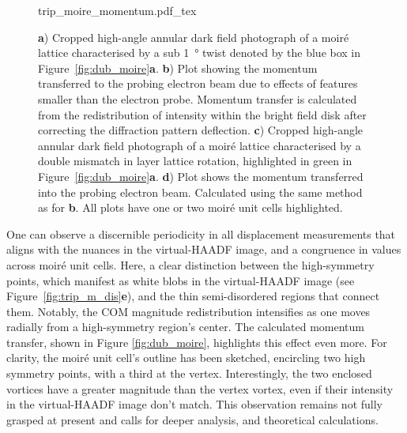 \begin{figure}[h]
    \centering
    \def\svgwidth{.9\linewidth}
    {trip_moire_momentum.pdf_tex}
    \caption{\textbf{a}) Cropped high-angle annular dark field photograph of a moiré lattice characterised by a sub \SI{1}{\degree} twist denoted by the blue box in Figure~\ref{fig:dub_moire}\textbf{a}. \textbf{b}) Plot showing the momentum transferred to the probing electron beam due to effects of features smaller than the electron probe. Momentum transfer is calculated from the redistribution of intensity within the bright field disk after correcting the diffraction pattern deflection. \textbf{c}) Cropped high-angle annular dark field photograph of a moiré lattice characterised by a double mismatch in layer lattice rotation, highlighted in green in Figure~\ref{fig:dub_moire}\textbf{a}. \textbf{d}) Plot shows the momentum transferred into the probing electron beam. Calculated using the same method as for \textbf{b}. All plots have one or two moiré unit cells highlighted.}
    \label{fig:trip_m_mom}
\end{figure}
%
One can observe a discernible periodicity in all displacement measurements that aligns with the nuances in the virtual-HAADF image, and a congruence in values across moiré unit cells. 
%
Here, a clear distinction between the high-symmetry points, which manifest as white blobs in the virtual-HAADF image (see Figure~\ref{fig:trip_m_dis}\textbf{e}), and the thin semi-disordered regions that connect them.
%
Notably, the COM magnitude redistribution intensifies as one  moves radially from a high-symmetry region's center. 
%
%
The calculated momentum transfer, shown in Figure \ref{fig:dub_moire}, highlights this effect even more. 
%
For clarity,  the moiré unit cell's outline has been sketched, encircling two high symmetry points, with a third at the vertex. 
%
Interestingly, the two enclosed vortices have a greater magnitude than the vertex vortex, even if their intensity in the virtual-HAADF image don't match. 
%
This observation remains not fully grasped at present and calls for deeper analysis, and theoretical calculations.

